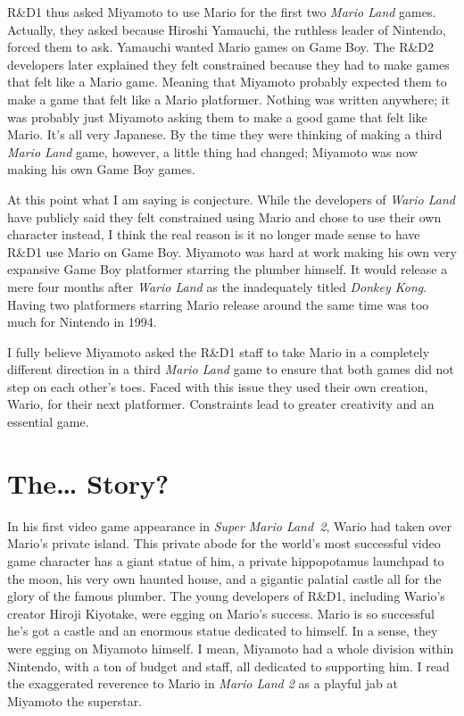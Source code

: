\documentclass{book}
\begin{document}
R\&D1 thus asked Miyamoto to use Mario for the first two \emph{Mario Land} games. Actually, they asked because Hiroshi Yamauchi, the ruthless leader of Nintendo, forced them to ask. Yamauchi wanted Mario games on Game Boy. The R\&D2 developers later explained they felt constrained because they had to make games that felt like a Mario game. Meaning that Miyamoto probably expected them to make a game that felt like a Mario platformer. Nothing was written anywhere; it was probably just Miyamoto asking them to make a good game that felt like Mario. It’s all very Japanese. By the time they were thinking of making a third \emph{Mario Land} game, however, a little thing had changed; Miyamoto was now making his own Game Boy games.

At this point what I am saying is conjecture. While the developers of \emph{Wario Land} have publicly said they felt constrained using Mario and chose to use their own character instead, I think the real reason is it no longer made sense to have R\&D1 use Mario on Game Boy. Miyamoto was hard at work making his own very expansive Game Boy platformer starring the plumber himself. It would release a mere four months after \emph{Wario Land} as the inadequately titled \emph{Donkey Kong}. Having two platformers starring Mario release around the same time was too much for Nintendo in 1994.

I fully believe Miyamoto asked the R\&D1 staff to take Mario in a completely different direction in a third \emph{Mario Land} game to ensure that both games did not step on each other’s toes. Faced with this issue they used their own creation, Wario, for their next platformer. Constraints lead to greater creativity and an essential game.

\FloatBarrier\needspace{10mm}\section*{The… Story?}\nopagebreak[4]

In his first video game appearance in \emph{Super Mario Land~2}, Wario had taken over Mario’s private island. This private abode for the world’s most successful video game character has a giant statue of him, a private hippopotamus launchpad to the moon, his very own haunted house, and a gigantic palatial castle all for the glory of the famous plumber. The young developers of R\&D1, including Wario’s creator Hiroji Kiyotake, were egging on Mario’s success. Mario is so successful he’s got a castle and an enormous statue dedicated to himself. In a sense, they were egging on Miyamoto himself. I mean, Miyamoto had a whole division within Nintendo, with a ton of budget and staff, all dedicated to supporting him. I read the exaggerated reverence to Mario in \emph{Mario Land 2} as a playful jab at Miyamoto the superstar.
\end{document}
